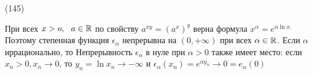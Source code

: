 (145)

При всех $x > o,\ \  a \in \mathbb{R}$ по свойству $a^{xy} = (a^x)^y$  верна формула $x^ \alpha = e^{\alpha \ln x.}$ Поэтому степенная функция $\epsilon_\alpha$ непрерывна на $(0, +\infty)$ при всех $\alpha \in \mathbb{R}$. Если $\alpha$ иррационально, то \F{$\epsilon_\alpha:[0, +\infty) \xra[]{\textit{на}}[0, +\infty),\quad \alpha > 0$,}   Непрерывность $\epsilon_\alpha$ в нуле при $\alpha > 0$ также имеет место: если $x_n > 0, x_n \to 0$, то $y_n = \ln x_n \to -\infty$ и $\epsilon_\alpha(x_n) = e^{\alpha y_n} \to 0 = e_\alpha(0)$